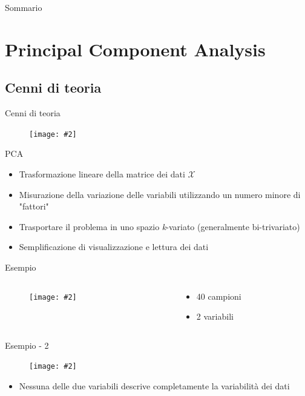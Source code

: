 \documentclass[xcolor={dvipsnames}]{beamer}
\newcommand{\figcen}[2]{
	\begin{figure}
		\begin{center}
			\texttt{[image: \#2]}
		\end{center}
	\end{figure}
}
\begin{document}
\begin{frame}{Sommario}

\tableofcontents

\end{frame}

\section{Principal Component Analysis}

	\subsection{Cenni di teoria}
	
		\begin{frame}{Cenni di teoria}
			\figcen{.8\textwidth}{libro}
		\end{frame}
	
		\begin{frame}{PCA}
			\begin{itemize}
				\item Trasformazione lineare della matrice dei dati $\mathcal{X}$
				\item Misurazione della variazione delle variabili utilizzando un numero minore di "fattori"
				\item Trasportare il problema in uno spazio \emph{k}-variato (generalmente bi-trivariato)
				\item Semplificazione di visualizzazione e lettura dei dati
			\end{itemize}
		\end{frame}


		\begin{frame}{Esempio}
			\begin{columns}
				\begin{column}{0.5\textwidth}
					\figcen{\columnwidth}{plotTeoria}
				\end{column}
				\begin{column}{0.5\textwidth}
					\begin{itemize}
						\item 40 campioni
						\item 2 variabili
					\end{itemize}
				\end{column}
			\end{columns}			
		\end{frame}

		\begin{frame}{Esempio - 2}
			\figcen{.8\textwidth}{proiezione}
			\begin{itemize}
				\item Nessuna delle due variabili descrive completamente la variabilità dei dati
			\end{itemize}
		\end{frame}
\end{document}
